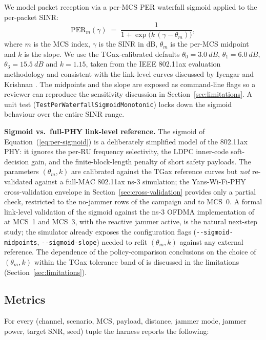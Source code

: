 \documentclass[journal,onecolumn,11pt,a4paper]{IEEEtran}
\begin{document}
We model packet reception via a per-MCS PER waterfall sigmoid
\cite{TGax571,Iyy22} applied to the per-packet SINR:
\begin{equation}
  \mathrm{PER}_m(\gamma)
  \;=\; \frac{1}{1+\exp\!\big(k\,(\gamma - \theta_m)\big)},
  \label{eq:per-sigmoid}
\end{equation}
where $m$ is the MCS index, $\gamma$ is the SINR in dB,
$\theta_m$ is the per-MCS midpoint and $k$ is the slope. We use the
TGax-calibrated defaults $\theta_0 = \SI{3.0}{dB}$,
$\theta_1 = \SI{6.0}{dB}$, $\theta_3 = \SI{15.5}{dB}$ and
$k = 1.15$, taken from the IEEE 802.11ax evaluation methodology
\cite{TGax571} and consistent with the link-level curves
discussed by Iyengar and Krishnan \cite{Iyy22}. The midpoints and
the slope are exposed as command-line flags so a reviewer can
reproduce the sensitivity discussion in
Section~\ref{sec:limitations}. A unit test
(\texttt{TestPerWaterfallSigmoidMonotonic}) locks down the
sigmoid behaviour over the entire SINR range.

\textbf{Sigmoid vs.\ full-PHY link-level reference.} The sigmoid
of Equation~(\ref{eq:per-sigmoid}) is a deliberately simplified
model of the 802.11ax PHY: it ignores the per-RU frequency
selectivity, the LDPC inner-code soft-decision gain, and the
finite-block-length penalty of short safety payloads. The
parameters $(\theta_m, k)$ are calibrated against the TGax
reference curves \cite{TGax571} but \emph{not} re-validated against
a full-MAC 802.11ax ns-3 simulation; the Yans-Wi-Fi-PHY
cross-validation envelope in Section~\ref{sec:cross-validation}
provides only a partial check, restricted to the no-jammer rows of
the campaign and to MCS~0. A formal link-level validation of the
sigmoid against the ns-3 OFDMA implementation of \cite{Mag21} at
MCS~1 and MCS~3, with the reactive jammer active, is the natural
next-step study; the simulator already exposes the configuration
flags (\texttt{-{}-sigmoid-midpoints}, \texttt{-{}-sigmoid-slope})
needed to refit $(\theta_m, k)$ against any external reference.
The dependence of the policy-comparison conclusions on the choice
of $(\theta_m, k)$ within the TGax tolerance band of \cite{TGax571}
is discussed in the limitations (Section~\ref{sec:limitations}).

\subsection{Metrics}
\label{sec:metrics}

For every (channel, scenario, MCS, payload, distance, jammer mode,
jammer power, target SNR, seed) tuple the harness reports the
following:
\end{document}
